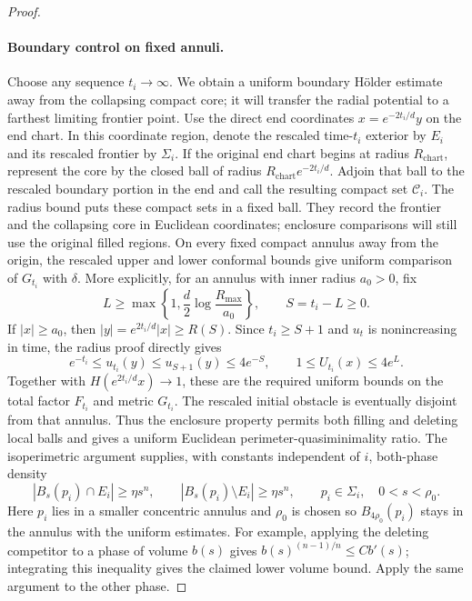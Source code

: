 \begin{proof}
\paragraph{Boundary control on fixed annuli.}
Choose any sequence $t_i\to\infty$. We obtain a uniform boundary
H\"older estimate away from the collapsing compact core; it will
transfer the radial potential to a farthest limiting frontier point.
Use the direct end coordinates $x=e^{-2t_i/d}y$ on the end chart.
In this coordinate region, denote the rescaled time-$t_i$ exterior
by $E_i$ and its rescaled frontier by $\Sigma_i$.
If the original end chart begins at radius $R_{\mathrm{chart}}$, represent the core
by the closed ball of radius $R_{\mathrm{chart}}e^{-2t_i/d}$. Adjoin that ball to the
rescaled boundary portion in the end and call the resulting compact set
$\mathcal C_i$. The radius bound puts these compact sets in a fixed ball.
They record the frontier and the collapsing core in Euclidean
coordinates; enclosure comparisons will still use the original filled
regions. On every fixed compact annulus
away from the origin, the rescaled upper and lower conformal bounds give
uniform comparison of $G_{t_i}$ with $\delta$. More explicitly, for
an annulus with inner radius $a_0>0$, fix
\[
 L\geq\max\left\{1,\frac d2\log\frac{R_{\max}}{a_0}\right\},
 \qquad S=t_i-L\geq0.
\]
If $|x|\geq a_0$, then $|y|=e^{2t_i/d}|x|\geq R(S)$.
Since $t_i\geq S+1$ and $u_t$ is nonincreasing in time, the radius proof directly gives
\[
 e^{-t_i}\leq u_{t_i}(y)\leq u_{S+1}(y)\leq4e^{-S},
 \qquad 1\leq U_{t_i}(x)\leq4e^L.
\]
Together with $H(e^{2t_i/d}x)\to1$, these are the required uniform
bounds on the total factor $F_{t_i}$ and metric $G_{t_i}$.
The rescaled initial
obstacle is eventually disjoint from that annulus. Thus the enclosure
property permits both filling and deleting local balls and gives a
uniform Euclidean perimeter-quasiminimality ratio. The isoperimetric
argument supplies, with constants independent of $i$, both-phase density
\[
 |B_s(p_i)\cap E_i|\geq\eta s^n,
 \qquad |B_s(p_i)\setminus E_i|\geq\eta s^n,
 \qquad p_i\in\Sigma_i,\quad 0<s<\rho_0.
\]
Here $p_i$ lies in a smaller concentric annulus and $\rho_0$ is chosen so
$B_{4\rho_0}(p_i)$ stays in the annulus with the uniform estimates.
For example, applying the deleting competitor to a phase of volume
$b(s)$ gives $b(s)^{(n-1)/n}\leq Cb'(s)$; integrating this inequality
gives the claimed lower volume bound. Apply the same argument to the
other phase.


\end{proof}
